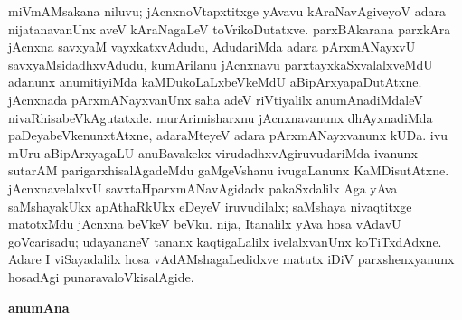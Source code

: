 miVmAMsakana niluvu; jAcnxnoV\-tapxtitxge yAvavu kAraNavAgiveyoV adara nijatanavanUnx aveV kAraNagaLeV toVrikoDu\-tatxve. parxBAkarana parxkAra jAcnxna savxyaM vayxkatxvAdudu, AdudariMda adara pArxmANayxvU savxyaMsidadhxvAdudu, kumArilanu jAcnxnavu parxtayxkaSxvalalxveMdU adanunx anumiti\-yiMda kaMDukoLaLxbeVkeMdU aBipArxyapaDutAtxne. jAcnxnada pArxmANayxvanUnx saha adeV riVti\-yalilx anumAnadiMdaleV nivaRhisabeVkAgutatxde. murArimisharxnu jAcnxnavanunx dhAyxna\-diMda paDeyabeVkenunxtAtxne, adaraMteyeV adara pArxmANayxvanunx kUDa. ivu mUru aBipArxyagaLU anuBavakekx virudadhxvAgiruvudariMda ivanunx sutarAM parigarxhisa\-lAga\-deMdu gaMgeVshanu ivugaLanunx KaMDisutAtxne. jAcnxnavelalxvU savxtaHparxmANavAgidadx pakaSx\-dalilx Aga yAva saMshayakUkx apAthaRkUkx eDeyeV iruvudilalx; saMshaya nivaqtitxge matotxMdu jAcnxna beVkeV beVku. nija, Itanalilx yAva hosa vAdavU goVcarisadu; udayananeV tananx kaqtigaLalilx ivelalxvanUnx koTiTxdAdxne. Adare I viSayadalilx hosa vAdAMshagaLedidxve matutx iDiV parxshenxyanunx hosadAgi punaravaloVkisalAgide.

\bigskip
\begin{center}
{\Large\bf anumAna}
\end{center}

